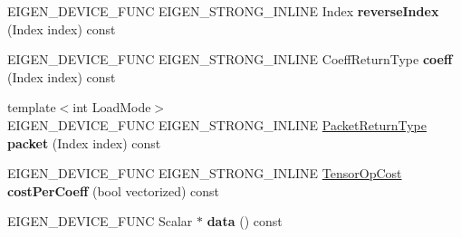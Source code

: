 \begin{DoxyCompactItemize}
E\+I\+G\+E\+N\+\_\+\+D\+E\+V\+I\+C\+E\+\_\+\+F\+U\+NC E\+I\+G\+E\+N\+\_\+\+S\+T\+R\+O\+N\+G\+\_\+\+I\+N\+L\+I\+NE Index {\bfseries reverse\+Index} (Index index) const
\item 
\mbox{\label{struct_eigen_1_1_tensor_evaluator_3_01const_01_tensor_reverse_op_3_01_reverse_dimensions_00_01_arg_type_01_4_00_01_device_01_4_a2adcbadfc5ac08c108523c027ea24cc6}} 
E\+I\+G\+E\+N\+\_\+\+D\+E\+V\+I\+C\+E\+\_\+\+F\+U\+NC E\+I\+G\+E\+N\+\_\+\+S\+T\+R\+O\+N\+G\+\_\+\+I\+N\+L\+I\+NE Coeff\+Return\+Type {\bfseries coeff} (Index index) const
\item 
\mbox{\label{struct_eigen_1_1_tensor_evaluator_3_01const_01_tensor_reverse_op_3_01_reverse_dimensions_00_01_arg_type_01_4_00_01_device_01_4_a0d54906349707061c440c87a7a96288c}} 
{\footnotesize template$<$int Load\+Mode$>$ }\\E\+I\+G\+E\+N\+\_\+\+D\+E\+V\+I\+C\+E\+\_\+\+F\+U\+NC E\+I\+G\+E\+N\+\_\+\+S\+T\+R\+O\+N\+G\+\_\+\+I\+N\+L\+I\+NE \hyperlink{group___sparse_core___module}{Packet\+Return\+Type} {\bfseries packet} (Index index) const
\item 
\mbox{\label{struct_eigen_1_1_tensor_evaluator_3_01const_01_tensor_reverse_op_3_01_reverse_dimensions_00_01_arg_type_01_4_00_01_device_01_4_aed6e09b8b134148a3820c24ab8c21c58}} 
E\+I\+G\+E\+N\+\_\+\+D\+E\+V\+I\+C\+E\+\_\+\+F\+U\+NC E\+I\+G\+E\+N\+\_\+\+S\+T\+R\+O\+N\+G\+\_\+\+I\+N\+L\+I\+NE \hyperlink{class_eigen_1_1_tensor_op_cost}{Tensor\+Op\+Cost} {\bfseries cost\+Per\+Coeff} (bool vectorized) const
\item 
\mbox{\label{struct_eigen_1_1_tensor_evaluator_3_01const_01_tensor_reverse_op_3_01_reverse_dimensions_00_01_arg_type_01_4_00_01_device_01_4_aec692135cd62b97d867e40d22d0e3de8}} 
E\+I\+G\+E\+N\+\_\+\+D\+E\+V\+I\+C\+E\+\_\+\+F\+U\+NC Scalar $\ast$ {\bfseries data} () const
\end{DoxyCompactItemize}
